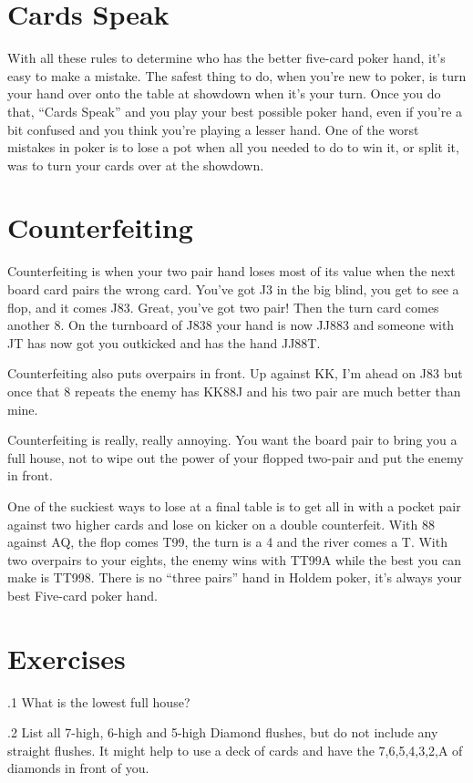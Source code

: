\section{Cards Speak}

With all these rules to determine who has the better five-card poker
hand, it's easy to make a mistake. The safest thing to do, when you're
new to poker, is turn your hand over onto the table at showdown when
it's your turn. Once you do that, ``Cards Speak'' and you play your
best possible poker hand, even if you're a bit confused and you think
you're playing a lesser hand. One of the worst mistakes in poker is to
lose a pot when all you needed to do to win it, or split it, was to
turn your cards over at the showdown.

\section{Counterfeiting}

Counterfeiting is when your two pair hand loses most of its value when
the next board card pairs the wrong card. You've got J3 in the big
blind, you get to see a flop, and it comes J83. Great, you've got two
pair! Then the turn card comes another 8. On the turnboard of J838
your hand is now JJ883 and someone with JT has now got you outkicked
and has the hand JJ88T.

Counterfeiting also puts overpairs in front. Up against KK, I'm ahead
on J83 but once that 8 repeats the enemy has KK88J and his two pair
are much better than mine.

Counterfeiting is really, really annoying. You want the board pair to
bring you a full house, not to wipe out the power of your flopped
two-pair and put the enemy in front.

One of the suckiest ways to lose at a final table is to get all in
with a pocket pair against two higher cards and lose on kicker on a
double counterfeit. With 88 against AQ, the flop comes T99,
the turn is a 4 and the river comes a T. With two overpairs to your
eights, the enemy wins with TT99A while the best you can make is
TT998. There is no ``three pairs'' hand in Holdem poker, it's always
your best Five-card poker hand.

\section{Exercises}

.1 What is the lowest full house?

.2 List all 7-high, 6-high and 5-high Diamond flushes,
but do not include any straight flushes. It might help to use a deck
of cards and have the 7,6,5,4,3,2,A of diamonds in front of you.
